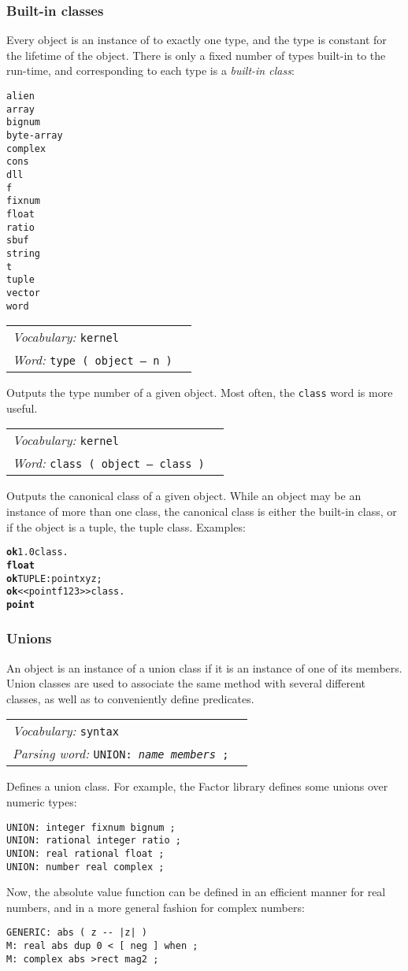 \documentclass{book}
\newcommand{\vocabulary}[1]{\emph{Vocabulary:} \texttt{#1}&\\}
\newcommand{\parsingword}[2]{\index{\texttt{#1}}\emph{Parsing word:} \texttt{#2}&\\}
\newcommand{\ordinaryword}[2]{\index{\texttt{#1}}\emph{Word:} \texttt{#2}&\\}
\newcommand{\wordtable}[1]{


\begin{tabularx}{12cm}{lX}
\hline
#1
\hline
\end{tabularx}

}
\begin{document}
\subsubsection{Built-in classes}
Every object is an instance of to exactly one type, and the type is constant for the lifetime of the object. There is only a fixed number of types built-in to the run-time, and corresponding to each type is a \emph{built-in class}:
\begin{verbatim}
alien
array
bignum
byte-array
complex
cons
dll
f
fixnum
float
ratio
sbuf
string
t
tuple
vector
word
\end{verbatim}
\wordtable{
\vocabulary{kernel}
\ordinaryword{type}{type ( object -- n )}
}
Outputs the type number of a given object. Most often, the \texttt{class} word is more useful.
\wordtable{
\vocabulary{kernel}
\ordinaryword{class}{class ( object -- class )}
}
Outputs the canonical class of a given object. While an object may be an instance of more than one class, the canonical class is either the built-in class, or if the object is a tuple, the tuple class. Examples:
\begin{alltt}
\textbf{ok} 1.0 class .
\textbf{float}
\textbf{ok} TUPLE: point x y z ;
\textbf{ok} << point f 1 2 3 >> class .
\textbf{point}
\end{alltt}

\subsubsection{Unions}
An object is an instance of a union class if it is an instance of one of its members. Union classes are used to associate the same method with several different classes, as well as to conveniently define predicates.
\wordtable{
\vocabulary{syntax}
\parsingword{UNION:}{UNION: \emph{name} \emph{members} ;}
}
Defines a union class. For example, the Factor library defines some unions over numeric types:
\begin{verbatim}
UNION: integer fixnum bignum ;
UNION: rational integer ratio ;
UNION: real rational float ;
UNION: number real complex ;
\end{verbatim}
Now, the absolute value function can be defined in an efficient manner
for real numbers, and in a more general fashion for complex numbers:
\begin{verbatim}
GENERIC: abs ( z -- |z| )
M: real abs dup 0 < [ neg ] when ;
M: complex abs >rect mag2 ;
\end{verbatim}
\end{document}
